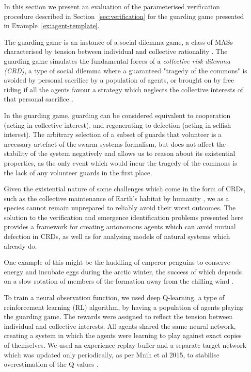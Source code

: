 
In this section we present an evaluation of the parameterised verification
procedure described in Section~\ref{sec:verification} for the guarding game
presented in Example~\ref{ex:agent-template}.


The guarding game is an instance of a social dilemma game, a class of
MASs characterised by tension between individual
and collective rationality \cite{VanlangeJPV13}. The guarding game simulates
the fundamental forces of a \emph{collective risk dilemma (CRD)}, a type of
social dilemma where a guaranteed "tragedy of the commons"
\cite{Hardin68} is avoided by personal sacrifice by a population of
agents, or brought on by free riding if all the agents favour a strategy which
neglects the collective interests of that personal sacrifice \cite{SantosP11}.

In the guarding game, guarding can be considered equivalent to cooperation
(acting in collective interest), and regenerating to defection (acting in
selfish interest). The arbitrary selection of a subset of guards that volunteer
is a necessary artefact of the swarm systems formalism, but does not affect the
stability of the system negatively and allows us to reason about its
existential properties, as the only event which would incur the tragedy of the
commons is the lack of any volunteer guards in the first place.

Given the existential nature of some challenges which come in the form of CRDs,
such as the collective maintenance of Earth's habitat by humanity
\cite{Smirnov19}, we as a species cannot remain unprepared to reliably avoid
their worst outcomes. The solution to the verification and
emergence identification problems presented here
provides a framework for creating autonomous agents which can avoid mutual
defection in CRDs, as well as for analysing models of natural systems which
already do.

One example of this might be the huddling of emperor penguins to conserve
energy and incubate eggs \cite{GilbertRLNA06} during the
arctic winter, the success of which depends on a slow rotation of members of
the formation away from the chilling wind \cite{WatersBK12}.

To train a neural observation function, we used deep Q-learning, a type of
reinforcement learning (RL) algorithm, by having a population of agents playing
the guarding game. The rewards were assigned to
reflect the tension between individual and collective interests. All agents
shared the same neural network, creating a system in which the agents were
learning to play against exact copies of themselves. We
used an experience replay buffer and a separate target network which
was updated only periodically, as per Mnih et al 2015, to stabilise
overestimation of the Q-values \cite{Mnih+15,HaaseltGS16}.

